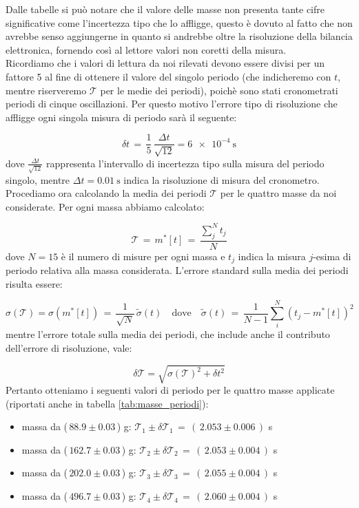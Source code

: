 Dalle tabelle si può notare che il valore delle masse non presenta tante cifre significative come l'incertezza tipo che lo affligge,
questo è dovuto al fatto che non avrebbe senso aggiungerne in quanto si andrebbe oltre la risoluzione della bilancia elettronica,
fornendo così al lettore valori non coretti della misura.\\

Ricordiamo che i valori di lettura da noi rilevati devono essere divisi per un fattore 5 al fine di ottenere il valore del singolo periodo
(che indicheremo con $t$, mentre riserveremo $\mathcal{T}$ per le medie dei periodi), poichè sono stati  cronometrati periodi di cinque oscillazioni. Per questo motivo l'errore tipo di risoluzione che affligge ogni singola misura di periodo sarà il seguente:

\begin{equation*}
	\delta t \,=\, \frac{1}{5} \, \frac{\Delta t}{\sqrt{12}} = \SI{6e-4}{\second}
\end{equation*}
%
dove $\frac{\Delta t}{\sqrt{12}}$ rappresenta l'intervallo di incertezza tipo sulla misura del periodo singolo, mentre
$\Delta t = \SI{0.01}{\second}$ indica la risoluzione di misura del cronometro.\\
Procediamo ora calcolando la media dei periodi $\mathcal{T}$ per le quattro masse da noi considerate. Per ogni massa
abbiamo calcolato:

\begin{equation*}
	\mathcal{T} \,=\, m^*[t] \,=\, \frac{\sum_{j}^{N} t_j}{N}
\end{equation*}
%
dove $N = 15$ è il numero di misure per ogni massa e $t_j$ indica la misura $j$-esima di periodo
relativa alla massa considerata. L'errore standard sulla media dei periodi risulta essere:

\begin{equation*}
    \sigma (\mathcal{T}) = \sigma(m^*[t]) \,=\, \frac{1}{\sqrt{N}} \, \tilde\sigma (t) \quad \text{dove} \quad \tilde\sigma(t)
    \,=\, \frac{1}{N-1} \sum_{i}^{N} (t_j - m^*[t])^2
\end{equation*}
%
mentre l'errore totale sulla media dei periodi, che include anche il contributo dell'errore di risoluzione, vale:

\begin{equation*}
    \delta \mathcal{T} = \sqrt{\sigma (\mathcal{T})^2 + \delta t^2}
\end{equation*}
%
Pertanto otteniamo i seguenti valori di periodo per le quattro masse applicate (riportati anche in tabella \ref{tab:masse_periodi}):
\begin{itemize}
	\item{ massa da ($\,88.9 \pm 0.03\,$) g: $\mathcal{T}_1 \pm \delta\mathcal{T}_1 \,=\, (\,2.053  \pm 0.006\,)$ s}
	\item{ massa da ($\,162.7 \pm 0.03\,$) g: $\mathcal{T}_2 \pm \delta\mathcal{T}_2 \,=\, (\,2.053 \pm 0.004\,)$ s}
	\item{ massa da ($\,202.0 \pm 0.03\,$) g: $\mathcal{T}_3 \pm \delta\mathcal{T}_3 \,=\, (\,2.055 \pm 0.004\,)$ s}
	\item{ massa da ($\,496.7 \pm 0.03\,$) g: $\mathcal{T}_4 \pm \delta\mathcal{T}_4 \,=\, (\,2.060 \pm 0.004\,)$ s}
\end{itemize}

